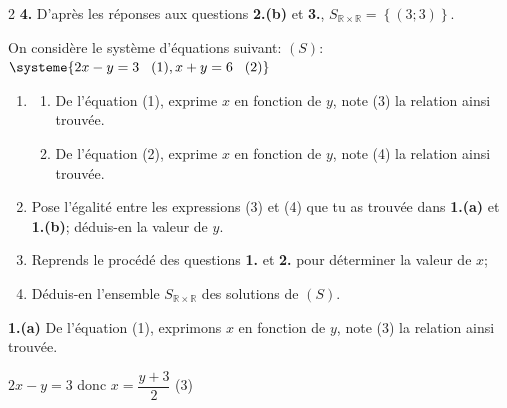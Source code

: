 \begin{multicols*}{2}
  	\textbf{4.} D'après les réponses aux questions \textbf{2.(b)} et  \textbf{3.}, $S_{\mathbb{R}\times \mathbb{R}}= \left\{\left(3;3\right)\right\}$.
  	
  	
  	On considère le système d’équations suivant: $(S)$: $\systeme{2x-y=3 \hspace{0.3cm} (1), x+y=6 \hspace{0.3cm} (2)}$
  	\begin{enumerate}
  		\item 
  		\begin{enumerate}
  			\item De l'équation (1), exprime $x$ en fonction de $y$, note (3) la relation ainsi trouvée.
  			\item  De l'équation (2), exprime $x$ en fonction de $y$, note (4) la relation ainsi trouvée. 
  		\end{enumerate}
  		\item Pose l'égalité entre les expressions  (3) et (4)  que tu as trouvée dans \textbf{1.(a)} et \textbf{1.(b)}; déduis-en la valeur de $y$.
  		\item Reprends le procédé des questions  \textbf{1.} et \textbf{2.} pour déterminer la valeur de $x$;
  		\item  Déduis-en l'ensemble $S_{\mathbb{R}\times \mathbb{R}}$  des solutions de $(S)$.
  	\end{enumerate}
  	\dure
  	\resul
  	\textbf{1.(a)} De l'équation (1), exprimons $x$ en fonction de $y$, note (3) la relation ainsi trouvée.
  	
  	$2x-y=3$ donc $x=\dfrac{y+3}{2}$ (3) 
  	

\end{multicols*}
